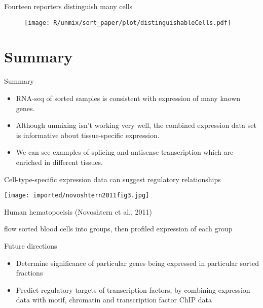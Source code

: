 \documentclass[serif,9pt]{beamer}
\begin{document}
\begin{frame}{Fourteen reporters distinguish many cells}

\begin{figure}
\begin{centering}
\texttt{[image: R/unmix/sort\_paper/plot/distinguishableCells.pdf]}

\end{centering}
\end{figure}

\end{frame}

\section{Summary}

\begin{frame}{Summary}

\begin{itemize}

\item RNA-seq of sorted samples is consistent with
expression of many known genes.

\item Although unmixing isn't working very well, the combined expression data
set is informative about tissue-specific expression.

\item We can see examples of splicing and antisense transcription
which are enriched in different tissues.

\end{itemize}

\end{frame}

\begin{frame}{Cell-type-specific expression data can suggest regulatory relationships}

\texttt{[image: imported/novoshtern2011fig3.jpg]}

Human hematopoeisis (Novoshtern et al., 2011)

{\small flow sorted blood cells into groups, then profiled expression of each group}

\end{frame}

\begin{frame}{Future directions}

\begin{itemize}

\item Determine significance of particular genes being expressed in particular
sorted fractions

\item Predict regulatory targets of transcription factors, by combining
expression data with motif, chromatin and transcription factor ChIP data

\end{itemize}

\end{frame}
\end{document}
